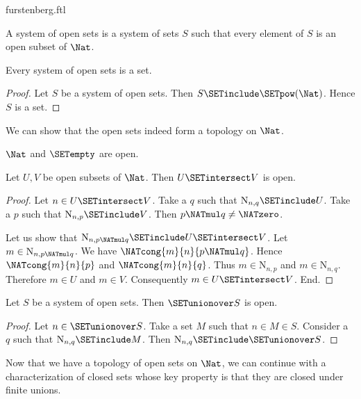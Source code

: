 \documentclass{article}
\newcommand{\N}{\mathrm{N}}
\begin{document}
\begin{smodule}{furstenberg.ftl}
\begin{forthel}
  \begin{definition}
    A system of open sets is a system of sets $S$ such that every element of
    $S$ is an open subset of $\Nat$.
  \end{definition}

  \begin{lemma}
    Every system of open sets is a set.
  \end{lemma}
  \begin{proof}
    Let $S$ be a system of open sets.
    Then $S \SETinclude \SETpow(\Nat)$.
    Hence $S$ is a set.
  \end{proof}
\end{forthel}

We can show that the open sets indeed form a topology on $\Nat$.

\begin{forthel}
  \begin{lemma}
    $\Nat$ and $\SETempty$ are open.
  \end{lemma}

  \begin{lemma}
    Let $U,V$ be open subsets of $\Nat$.
    Then $U \SETintersect V$ is open.
  \end{lemma}
  \begin{proof}
    Let $n \in U \SETintersect V$.
    Take a $q$ such that $\N_{n, q} \SETinclude U$.
    Take a $p$ such that $\N_{n, p} \SETinclude V$.
    Then $p \NATmul q \neq \NATzero$.

    Let us show that $\N_{n, p \NATmul q} \SETinclude U \SETintersect V$.
      Let $m \in \N_{n, p \NATmul q}$.
      We have $\NATcong{m}{n}{p \NATmul q}$.
      Hence $\NATcong{m}{n}{p}$ and $\NATcong{m}{n}{q}$.
      Thus $m \in \N_{n, p}$ and $m \in \N_{n, q}$.
      Therefore $m \in U$ and $m \in V$.
      Consequently $m \in U \SETintersect V$.
    End.
  \end{proof}

  \begin{lemma}
    Let $S$ be a system of open sets.
    Then $\SETunionover S$ is open.
  \end{lemma}
  \begin{proof}
    Let $n \in \SETunionover S$.
    Take a set $M$ such that $n \in M \in S$.
    Consider a $q$ such that $\N_{n, q} \SETinclude M$.
    Then $\N_{n, q} \SETinclude \SETunionover S$.
  \end{proof}
\end{forthel}

Now that we have a topology of open sets on $\Nat$, we can continue
with a characterization of closed sets whose key property is that they are
closed under finite unions.


\end{smodule}
\end{document}
